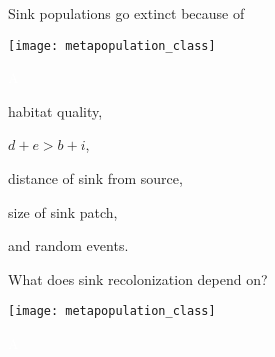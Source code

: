 \documentclass[t]{beamer}
\begin{document}
\begin{frame}[t]{Sink populations go extinct because of}
	\begin{minipage}{0.5\textwidth}
		\begin{center}
			\vspace{1\baselineskip}
			\texttt{[image: metapopulation\_class]}
		\end{center}
	\end{minipage}\begin{minipage}{0.5\textwidth}
		\flushleft
		
		\hangpara \textcolor{white}{A}\vspace{-1\baselineskip}
		
		\hangpara habitat quality,\pause
		
		\hangpara $d + e > b + i$,\pause
		
		\hangpara distance of sink from source,\pause
		
		\hangpara size of sink patch,\pause
		
		\hangpara and random events.
		
	\end{minipage}	
\end{frame}
%

\begin{frame}{What does sink recolonization depend on?}
	\begin{minipage}{0.5\textwidth}
		\begin{center}
			\vspace{1\baselineskip}
			\texttt{[image: metapopulation\_class]}
		\end{center}
	\end{minipage}\begin{minipage}{0.5\textwidth}
		\flushleft
		
		\hangpara \textcolor{white}{A}\vspace{-1\baselineskip}
		
		\hangpara \makebox[0.8\textwidth]{\hrulefill}
		
		\hangpara \makebox[0.8\textwidth]{\hrulefill}
		
		\hangpara \makebox[0.8\textwidth]{\hrulefill}
		
		\hangpara \makebox[0.8\textwidth]{\hrulefill}
		
		\hangpara \makebox[0.8\textwidth]{\hrulefill}
		
		\hangpara \makebox[0.8\textwidth]{\hrulefill}		
	\end{minipage}		
\end{frame}
%
\end{document}
